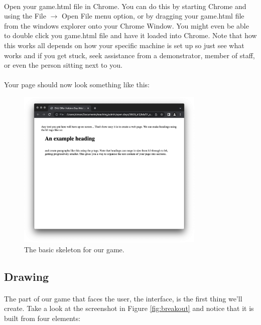 \documentclass[10pt, a4paper, oneside]{article}
\begin{document}
\paragraph{} Open your game.html file in Chrome. You can do this by starting Chrome and using the File $\to$ Open File menu option, or by dragging your game.html file from the windows explorer onto your Chrome Window. You might even be able to double click you game.html file and have it loaded into Chrome. Note that how this works all depends on how your specific machine is set up so just see what works and if you get stuck, seek assistance from a demonstrator, member of staff, or even the person sitting next to you.

\paragraph{} Your page should now look something like this:

\begin{figure}[H]
\centering
\includegraphics[width=0.8\textwidth]{images/01_skeleton+skeleton.png}
\caption{The basic skeleton for our game.}
\label{fig:01_skeleton+skeleton}
\end{figure}


\subsection{Drawing}

\paragraph{} The part of our game that faces the user, the interface, is the first thing we'll create. Take a look at the screenshot in Figure \ref{fig:breakout} and notice that it is built from four elements:
\end{document}
